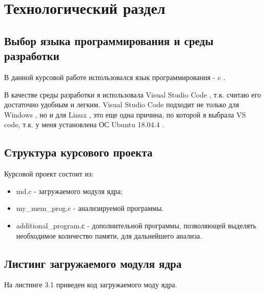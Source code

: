 \chapter{Технологический раздел}
\label{cha:design}

\section{Выбор языка программирования и среды разработки}

В данной курсовой работе использовался язык программирования - c \cite{bib1}.

В качестве среды разработки я использовала Visual Studio Code \cite{bib2}, т.к. считаю его достаточно удобным и легким.
Visual Studio Code подходит не только для  Windows \cite{bib3}, но и для Linux \cite{bib4}, это еще одна причина, по которой я выбрала VS code,
т.к. у меня установлена ОС Ubuntu 18.04.4 \cite{bib5}.

\section{Структура курсового проекта}

Курсовой проект состоит из:

\begin{itemize}
	\item md.c - загружаемого модуля ядра;
	\item my\_mem\_prog.c - анализируемой программы.
	\item additional\_program.с - дополнительной программы, позволяющей выделять 
	необходимое количество памяти, для дальнейшего анализа.
\end{itemize}

\section{Листинг загружаемого модуля ядра}

На листинге 3.1 приведен код загружаемого моду ядра. 

